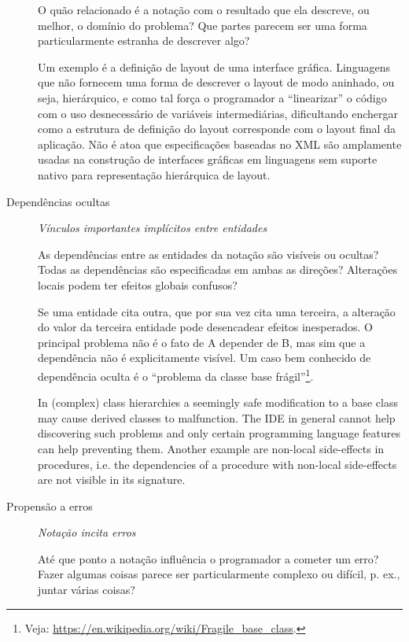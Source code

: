 \begin{description}
O quão relacionado é a notação com o resultado que ela descreve, ou
melhor, o domínio do problema? Que partes parecem ser uma forma
particularmente estranha de descrever algo?

\begin{citacao}
  Um exemplo é a definição de layout de uma interface gráfica. Linguagens que
  não fornecem uma forma de descrever o layout de modo aninhado, ou seja,
  hierárquico, e como tal força o programador a “linearizar” o código com o uso
  desnecessário de variáveis intermediárias, dificultando enchergar como a
  estrutura de definição do layout corresponde com o layout final da aplicação.
  Não é atoa que especificações baseadas no XML são amplamente usadas na
  construção de interfaces gráficas em linguagens sem suporte nativo para
  representação hierárquica de layout.
  \cite[p.~13; tradução nossa]{kiss2014}
\end{citacao}

\item[{Dependências ocultas}] \emph{Vínculos importantes implícitos entre entidades}

As dependências entre as entidades da notação são visíveis ou ocultas?
Todas as dependências são especificadas em ambas as direções? Alterações
locais podem ter efeitos globais confusos?

Se uma entidade cita outra, que por sua vez cita uma terceira, a
alteração do valor da terceira entidade pode desencadear efeitos
inesperados. O principal problema não é o fato de A depender de B, mas sim
que a dependência não é explicitamente visível. Um caso bem conhecido de dependência
oculta é o “problema da classe base frágil”\footnote{Veja: \url{https://en.wikipedia.org/wiki/Fragile\_base\_class}.}.

\begin{citacao}
  In (complex) class hierarchies a seemingly safe modification to a base class
  may cause derived classes to malfunction. The IDE in general cannot help
  discovering such problems and only certain programming language features can
  help preventing them. Another example are non-local side-effects in
  procedures, i.e. the dependencies of a procedure with non-local side-effects
  are not visible in its signature.
  \cite[pg.~14]{kiss2014}
\end{citacao}

\item[{Propensão a erros}] \emph{Notação incita erros}

Até que ponto a notação influência o programador a cometer um erro? Fazer
algumas coisas parece ser particularmente complexo ou difícil, p. ex.,
juntar várias coisas?


\end{description}
